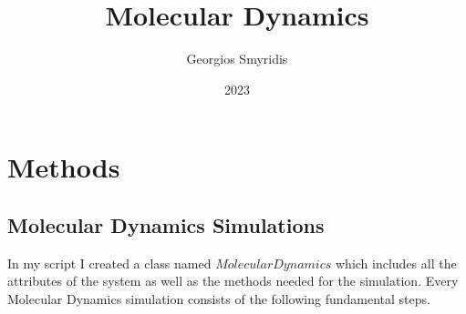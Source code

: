 \documentclass[11pt]{article}
\title{Molecular Dynamics}
\author{Georgios Smyridis}
\date{2023}
\begin{document}
\maketitle


\section{Methods}

\subsection{Molecular Dynamics Simulations}

In my script I created a class named $MolecularDynamics$ which includes all the attributes of the system as well as the methods needed for the simulation. Every Molecular Dynamics simulation consists of the following fundamental steps.
\end{document}
